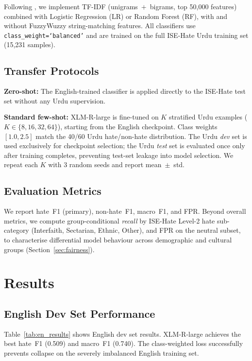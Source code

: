 \documentclass{article}
\begin{document}
Following \citet{ullah2024fuzzy}, we implement TF-IDF (unigrams~$+$~bigrams,
top 50{,}000 features) combined with Logistic Regression (LR) or Random
Forest (RF), with and without FuzzyWuzzy string-matching features.
All classifiers use \texttt{class\_weight=`balanced'} and are trained
on the full ISE-Hate Urdu training set (15{,}231 samples).

\subsection{Transfer Protocols}

\textbf{Zero-shot:} The English-trained classifier is applied directly to
the ISE-Hate test set without any Urdu supervision.

\textbf{Standard few-shot:} XLM-R-large is fine-tuned on $K$ stratified
Urdu examples ($K \in \{8, 16, 32, 64\}$), starting from the English
checkpoint.
Class weights $[1.0, 2.5]$ match the 40/60 Urdu hate/non-hate distribution.
The Urdu \emph{dev} set is used exclusively for checkpoint selection;
the Urdu \emph{test} set is evaluated once only after training completes,
preventing test-set leakage into model selection.
We repeat each $K$ with 3 random seeds and report mean~$\pm$~std.

\subsection{Evaluation Metrics}

We report hate~F1 (primary), non-hate~F1, macro~F1, and FPR.
Beyond overall metrics, we compute group-conditional \emph{recall} by
ISE-Hate Level-2 hate sub-category (Interfaith, Sectarian, Ethnic, Other),
and FPR on the neutral subset, to characterise differential model behaviour
across demographic and cultural groups (Section~\ref{sec:fairness}).

\section{Results}
\label{sec:results}

\subsection{English Dev Set Performance}

Table~\ref{tab:en_results} shows English dev set results.
XLM-R-large achieves the best hate~F1 (0.509) and macro~F1 (0.740).
The class-weighted loss successfully prevents collapse on the severely
imbalanced English training set.
\end{document}
